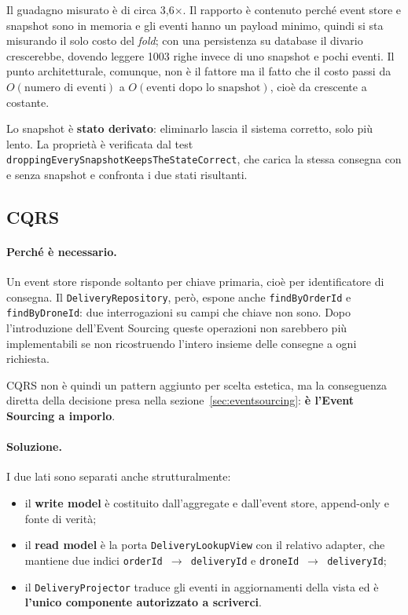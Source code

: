 \documentclass[12pt,a4paper]{article}
\begin{document}
Il guadagno misurato \`e di circa 3,6$\times$. Il rapporto \`e contenuto perch\'e event store e
snapshot sono in memoria e gli eventi hanno un payload minimo, quindi si sta misurando il solo costo
del \emph{fold}; con una persistenza su database il divario crescerebbe, dovendo leggere 1003 righe
invece di uno snapshot e pochi eventi. Il punto architetturale, comunque, non \`e il fattore ma il
fatto che il costo passi da $O(\text{numero di eventi})$ a $O(\text{eventi dopo lo snapshot})$, cio\`e
da crescente a costante.

Lo snapshot \`e \textbf{stato derivato}: eliminarlo lascia il sistema corretto, solo pi\`u lento.
La propriet\`a \`e verificata dal test \texttt{droppingEverySnapshotKeepsTheStateCorrect}, che carica
la stessa consegna con e senza snapshot e confronta i due stati risultanti.

\subsection{CQRS}
\label{sec:cqrs}

\paragraph{Perch\'e \`e necessario.} Un event store risponde soltanto per chiave primaria, cio\`e per
identificatore di consegna. Il \texttt{DeliveryRepository}, per\`o, espone anche
\texttt{findByOrderId} e \texttt{findByDroneId}: due interrogazioni su campi che chiave non sono.
Dopo l'introduzione dell'Event Sourcing queste operazioni non sarebbero pi\`u implementabili se non
ricostruendo l'intero insieme delle consegne a ogni richiesta.

CQRS non \`e quindi un pattern aggiunto per scelta estetica, ma la conseguenza diretta della
decisione presa nella sezione~\ref{sec:eventsourcing}: \textbf{\`e l'Event Sourcing a imporlo}.

\paragraph{Soluzione.} I due lati sono separati anche strutturalmente:

\begin{itemize}
  \item il \textbf{write model} \`e costituito dall'aggregate e dall'event store, append-only e
        fonte di verit\`a;
  \item il \textbf{read model} \`e la porta \texttt{DeliveryLookupView} con il relativo adapter, che
        mantiene due indici \texttt{orderId $\rightarrow$ deliveryId} e
        \texttt{droneId $\rightarrow$ deliveryId};
  \item il \texttt{DeliveryProjector} traduce gli eventi in aggiornamenti della vista ed \`e
        \textbf{l'unico componente autorizzato a scriverci}.
\end{itemize}
\end{document}
